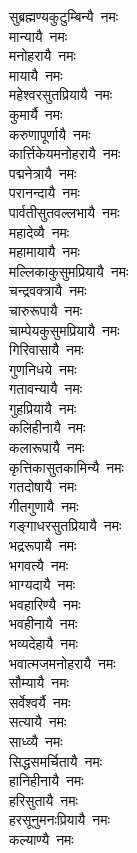 \begin{flushleft}
\begin{multicols}{2}
सुब्रह्मण्यकुटुम्बिन्यै~नमः\\
मान्यायै~नमः\\
मनोहरायै~नमः\\
मायायै~नमः\\
महेश्वरसुतप्रियायै~नमः\\
कुमार्यै~नमः\\
करुणापूर्णायै~नमः\\
कार्त्तिकेयमनोहरायै~नमः\\
पद्मनेत्रायै~नमः\\
परानन्दायै~नमः\hfill{}\\
पार्वतीसुतवल्लभायै~नमः\\
महादेव्यै~नमः\\
महामायायै~नमः\\
मल्लिकाकुसुमप्रियायै~नमः\\
चन्द्रवक्त्रायै~नमः\\
चारुरूपायै~नमः\\
चाम्पेयकुसुमप्रियायै~नमः\\
गिरिवासायै~नमः\\
गुणनिधये~नमः\\
गतावन्यायै~नमः\hfill{}\\
गुहप्रियायै~नमः\\
कलिहीनायै~नमः\\
कलारूपायै~नमः\\
कृत्तिकासुतकामिन्यै~नमः\\
गतदोषायै~नमः\\
गीतगुणायै~नमः\\
गङ्गाधरसुतप्रियायै~नमः\\
भद्ररूपायै~नमः\\
भगवत्यै~नमः\\
भाग्यदायै~नमः\hfill{}\\
भवहारिण्यै~नमः\\
भवहीनायै~नमः\\
भव्यदेहायै~नमः\\
भवात्मजमनोहरायै~नमः\\
सौम्यायै~नमः\\
सर्वेश्वर्यै~नमः\\
सत्यायै~नमः\\
साध्व्यै~नमः\\
सिद्धसमर्चितायै~नमः\\
हानिहीनायै~नमः\hfill{}\\
हरिसुतायै~नमः\\
हरसूनुमनःप्रियायै~नमः\\
कल्याण्यै~नमः\\

\end{multicols}
\end{flushleft}
